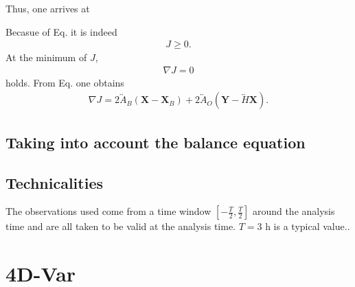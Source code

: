 \documentclass{report}
\begin{document}
Thus, one arrives at
%
\begin{center}
\end{center}
%
Becasue of Eq. it is indeed
%
\begin{eqnarray}
J \geq 0.
\end{eqnarray}
%
At the minimum of $J$,
%
\begin{eqnarray}
\nabla J = 0
\end{eqnarray}
%
holds. From Eq. one obtains
%
\begin{eqnarray}
\nabla J = 2\overleftrightarrow{A}_B\left(\mathbf{X} - \mathbf{X}_B\right) + 2\overleftrightarrow{A}_O\left(\mathbf{Y} - \overleftrightarrow{H}\mathbf{X}\right).
\end{eqnarray}

\section{Taking into account the balance equation}
\label{sec:taking_into_account_the_balance_equation}

\section{Technicalities}
\label{sec:technicalities_3d-var}

The observations used come from a time window $\left[-\frac{T}{2}, \frac{T}{2}\right]$ around the analysis time and are all taken to be valid at the analysis time. $T = 3$ h is a typical value..

\chapter{4D-Var}
\label{chap:4d-var}
\end{document}
